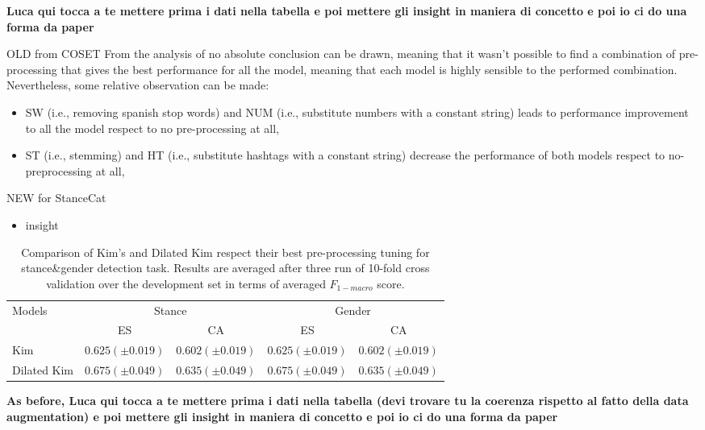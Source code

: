 \textbf{Luca qui tocca a te mettere prima i dati nella tabella e poi mettere gli insight in maniera di concetto e poi io ci do una forma da paper}

OLD from COSET
From the analysis of  no absolute conclusion can be drawn, meaning that it wasn't possible to find a combination of pre-processing that gives the best performance for all the model, meaning that each model is highly sensible to the performed combination. Nevertheless, some relative observation can be made:
\begin{itemize}
	\item SW (i.e., removing spanish stop words) and NUM (i.e., substitute numbers with a constant string) leads to performance improvement to all the model respect to no pre-processing at all,
	\item ST (i.e., stemming) and HT (i.e., substitute hashtags with a constant string) decrease the performance of both models respect to no-preprocessing at all,
\end{itemize}

NEW for StanceCat
\begin{itemize}
	\item insight
\end{itemize}



\begin{table}[h]
\footnotesize
\caption{Comparison of Kim's and Dilated Kim respect their best pre-processing tuning for stance\&gender detection task. Results are averaged after three run of 10-fold cross validation over the development set in terms of averaged $F_{1-macro}$ score.}
\label{tab:dilation}
\centering
\begin{tabular}{l|cc|cc}
\toprule
\hline
\multirow{2}{*}{Models}		& \multicolumn{2}{c}{Stance}	& \multicolumn{2}{c}{Gender}\\
\cline{2-5}
							& ES		& CA		& ES		& CA		\\
\hline
Kim							& $0.625 (\pm0.019)$ & $0.602 (\pm0.019)$ & $0.625 (\pm0.019)$ & $0.602 (\pm0.019)$	\\
Dilated Kim					& $0.675 (\pm0.049)$ & $0.635 (\pm0.049)$ & $0.675 (\pm0.049)$ & $0.635 (\pm0.049)$	\\
\hline
\bottomrule
\end{tabular}
\end{table}

\textbf{As before, Luca qui tocca a te mettere prima i dati nella tabella (devi trovare tu la coerenza rispetto al fatto della data augmentation) e poi mettere gli insight in maniera di concetto e poi io ci do una forma da paper}

